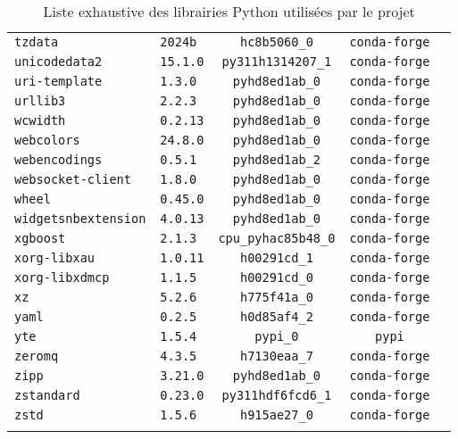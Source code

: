 \begin{longtable}{p{}|l|ccc}
\texttt{tzdata} & \texttt{2024b} & \texttt{hc8b5060\_0} & \texttt{conda-forge} \\
\texttt{unicodedata2} & \texttt{15.1.0} & \texttt{py311h1314207\_1} & \texttt{conda-forge} \\
\texttt{uri-template} & \texttt{1.3.0} & \texttt{pyhd8ed1ab\_0} & \texttt{conda-forge} \\
\texttt{urllib3} & \texttt{2.2.3} & \texttt{pyhd8ed1ab\_0} & \texttt{conda-forge} \\
\texttt{wcwidth} & \texttt{0.2.13} & \texttt{pyhd8ed1ab\_0} & \texttt{conda-forge} \\
\texttt{webcolors} & \texttt{24.8.0} & \texttt{pyhd8ed1ab\_0} & \texttt{conda-forge} \\
\texttt{webencodings} & \texttt{0.5.1} & \texttt{pyhd8ed1ab\_2} & \texttt{conda-forge} \\
\texttt{websocket-client} & \texttt{1.8.0} & \texttt{pyhd8ed1ab\_0} & \texttt{conda-forge} \\
\texttt{wheel} & \texttt{0.45.0} & \texttt{pyhd8ed1ab\_0} & \texttt{conda-forge} \\
\texttt{widgetsnbextension} & \texttt{4.0.13} & \texttt{pyhd8ed1ab\_0} & \texttt{conda-forge} \\
\texttt{xgboost} & \texttt{2.1.3} & \texttt{cpu\_pyhac85b48\_0} & \texttt{conda-forge} \\
\texttt{xorg-libxau} & \texttt{1.0.11} & \texttt{h00291cd\_1} & \texttt{conda-forge} \\
\texttt{xorg-libxdmcp} & \texttt{1.1.5} & \texttt{h00291cd\_0} & \texttt{conda-forge} \\
\texttt{xz} & \texttt{5.2.6} & \texttt{h775f41a\_0} & \texttt{conda-forge} \\
\texttt{yaml} & \texttt{0.2.5} & \texttt{h0d85af4\_2} & \texttt{conda-forge} \\
\texttt{yte} & \texttt{1.5.4} & \texttt{pypi\_0} & \texttt{pypi} \\
\texttt{zeromq} & \texttt{4.3.5} & \texttt{h7130eaa\_7} & \texttt{conda-forge} \\
\texttt{zipp} & \texttt{3.21.0} & \texttt{pyhd8ed1ab\_0} & \texttt{conda-forge} \\
\texttt{zstandard} & \texttt{0.23.0} & \texttt{py311hdf6fcd6\_1} & \texttt{conda-forge} \\
\texttt{zstd} & \texttt{1.5.6} & \texttt{h915ae27\_0} & \texttt{conda-forge} \\
\bottomrule
        \caption{Liste exhaustive des librairies Python utilisées par le projet}
\end{longtable}